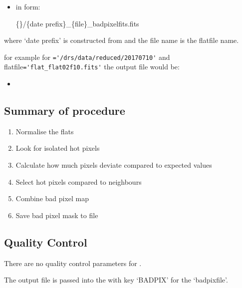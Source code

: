 \begin{itemize}
\item {} in form:
\begin{tcustomdir}
\{\reduceddir\}/\{date prefix\}\_\{file\}\_badpixelfits.fits
\end{tcustomdir}
\end{itemize}

\noindent where `date prefix' is constructed from \argnightname and the file name is the flatfile name.

\noindent for example for \reduceddir\lstinline[style=pythoninline]|='/drs/data/reduced/20170710'| and flatfile\lstinline[style=pythoninline]|='flat_flat02f10.fits'| the output file would be:
\begin{tcustomdir}
\begin{itemize}
\item {}
\end{itemize}
\end{tcustomdir}

\subsection{Summary of procedure}
\begin{enumerate}
	\item Normalise the flats
	\item Look for isolated hot pixels
	\item Calculate how much pixels deviate compared to expected values
	\item Select hot pixels compared to neighbours
	\item Combine bad pixel map
	\item Save bad pixel mask to file
\end{enumerate}


\subsection{Quality Control}

There are no quality control parameters for \calbadpix.

The output file is passed into the \calibdb with key `BADPIX' for the `badpixfile'. \\

